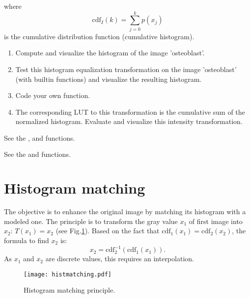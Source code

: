  where $${\displaystyle \mathrm{cdf}_I(k)=\sum _{j=0}^{k}p(x_{j})} $$ is the cumulative distribution function (cumulative histogram). 

\begin{qbox}
\begin{enumerate}
	\item Compute and visualize the histogram of the image 'osteoblast'.
	\item Test this histogram equalization transformation on the image 'osteoblast' (with builtin functions) and visualize the resulting histogram.
	\item Code your own function.
	\item The corresponding LUT to this transformation is the cumulative sum of the normali\-zed his\-to\-gram. Evaluate and visualize this intensity transformation.
\end{enumerate}
\end{qbox}

\begin{mcomment}
\begin{mremark}
See the ,  and  functions.
\end{mremark}
\end{mcomment}

\begin{pcomment}
\begin{premark}
See the  and   functions.
\end{premark}
\end{pcomment}

\section{Histogram matching}
The objective is to enhance the original image by matching its histogram with a modeled one. The principle is to transform the gray value $x_1$ of first image into $x_2$: $T(x_1)=x_2$ (see Fig.\ref{fig:enhancement:enonce:histmatching}). Based on the fact that $\mathrm{cdf}_1(x_1)=\mathrm{cdf}_2(x_2)$, the formula to find $x_2$ is: $$x_2=\mathrm{cdf}_2^{-1}\left(\mathrm{cdf}_1(x_1)\right).$$ 
As $x_1$ and $x_2$ are discrete values, this requires an interpolation.

\begin{figure}[htbp]
 \centering\caption{Histogram matching principle.}%
 \texttt{[image: histmatching.pdf]}%
 \label{fig:enhancement:enonce:histmatching}%
\end{figure}


